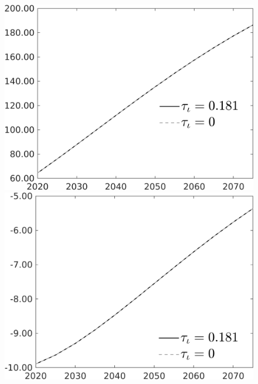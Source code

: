 \documentclass[12pt]{article}
\begin{document}
\begin{figure}[h!!]
\begin{minipage}[]{0.32\textwidth}
\end{minipage}	
	\begin{minipage}[]{0.32\textwidth}
	\includegraphics[width=1\textwidth]{../../codding_model/own_basedOnFried/optimalPol_010922_revision/figures/all_13Sept22/PerdifNoTauf_Equlab_regime0_CompTaul_sg_spillover0_nsk1_xgr0_knspil1_sep1_LFlimit0_emsbase0_countec0_GovRev0_etaa0.79_lgd1.png}
\end{minipage}	
	\begin{minipage}[]{0.32\textwidth}
	\includegraphics[width=1\textwidth]{../../codding_model/own_basedOnFried/optimalPol_010922_revision/figures/all_13Sept22/PerdifNoTauf_Equlab_regime0_CompTaul_wsn_spillover0_nsk1_xgr0_knspil1_sep1_LFlimit0_emsbase0_countec0_GovRev0_etaa0.79_lgd1.png}

\end{minipage}
\end{figure}
\end{document}
